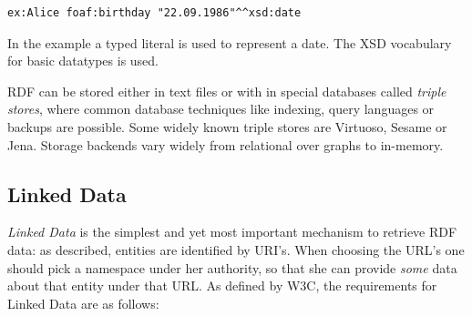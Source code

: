\begin{lstlisting}[style=N3]
ex:Alice foaf:birthday "22.09.1986"^^xsd:date
\end{lstlisting}
In the example a typed literal is used to represent a date. 
The XSD vocabulary for basic datatypes is used.

RDF can be stored either in text files or with in special databases called \textit{triple stores}, where common database techniques like indexing, query languages or backups are possible. 
Some widely known triple stores are Virtuoso, Sesame  or Jena. 
Storage backends vary widely from relational over graphs to in-memory.

\subsection{Linked Data}
\textit{Linked Data} is the simplest and yet most important mechanism to retrieve RDF data: as described, entities are identified by URI's. 
When choosing the URL's one should pick a namespace under her authority, so that she can provide \textit{some} data about that entity under that URL. As defined by W3C, the requirements for Linked Data are as follows:

